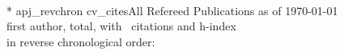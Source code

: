 \documentclass[12pt]{article}
\begin{document}
\vfill  
\nopagebreak

\newpage

\nocite{bibc}{*}
{apj_revchron}
{cv_cites}{All Refereed Publications as of \today\\
\nfirst first author, \nrefereed total, with \ncitestotal\ citations and h-index \hindex\\
in reverse chronological order:}
%





%
\end{document}
